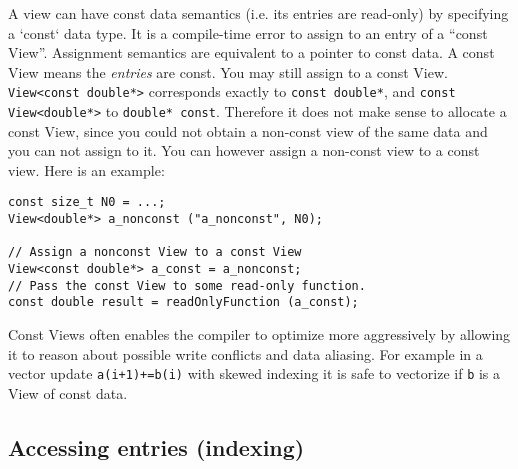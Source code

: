 A view can have const data semantics (i.e. its entries are read-only) by 
specifying a `const` data type.  It is a compile-time error to assign to an 
entry of a ``const View''.  Assignment semantics are equivalent to a pointer to 
const data.  
A const View means the \emph{entries} are const.  You
may still assign to a const View.  \lstinline!View<const double*>!
corresponds exactly to \lstinline!const double*!, and
\lstinline!const View<double*>! to \lstinline!double* const!.
Therefore it does not make sense to allocate a const View,
since you could not obtain a non-const view of the same data and you 
can not assign to it. You can however assign a non-const view to a const
view.  Here is an example:
\begin{lstlisting}
const size_t N0 = ...;
View<double*> a_nonconst ("a_nonconst", N0);

// Assign a nonconst View to a const View
View<const double*> a_const = a_nonconst;
// Pass the const View to some read-only function.
const double result = readOnlyFunction (a_const);
\end{lstlisting}

Const Views often enables the compiler to optimize more aggressively by allowing it
to reason about possible write conflicts and data aliasing. For example in a vector
update \lstinline|a(i+1)+=b(i)| with skewed indexing it is safe to vectorize if
\lstinline|b| is a View of const data.

\subsection{Accessing entries (indexing)}

